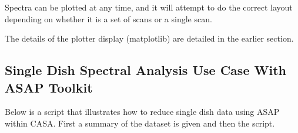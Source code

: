Spectra can be plotted at any time, and it will attempt to do the
correct layout depending on whether it is a set of scans or a single
scan. 

The details of the plotter display (matplotlib) are detailed in the
earlier section. 

\subsection{Single Dish Spectral Analysis Use Case With ASAP Toolkit}
\label{subsection:sd.asap.usecase}

Below is a script that illustrates how to reduce single dish data
using ASAP within CASA.  First a summary of the dataset is given and
then the script.

